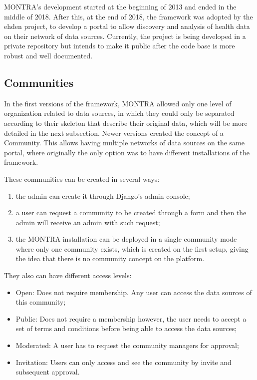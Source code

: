 MONTRA's development started at the beginning of 2013 and ended in the middle of 2018.
After this, at the end of 2018, the framework was adopted by the \gls{ehden} project, to develop a portal to allow discovery and analysis of health data on their network of data sources.
Currently, the project is being developed in a private repository but intends to make it public after the code base is more robust and well documented.

\subsection{Communities}

In the first versions of the framework, MONTRA allowed only one level of organization related to data sources, in which they could only be separated according to their skeleton that describe their original data, which will be more detailed in the next subsection.
Newer versions created the concept of a Community.
This allows having multiple networks of data sources on the same portal, where originally the only option was to have different installations of the framework.

These communities can be created in several ways:

\begin{enumerate}
    \item the admin can create it through Django's admin console;
    \item a user can request a community to be created through a form and then the admin will receive an admin with such request;
    \item the MONTRA installation can be deployed in a single community mode where only one community exists, which is created on the first setup, giving the idea that there is no community concept on the platform.
\end{enumerate}

They also can have different access levels:

\begin{itemize}
    \item Open: Does not require membership. Any user can access the data sources of this community;
    \item Public: Does not require a membership however, the user needs to accept a set of terms and conditions before being able to access the data sources;
    \item Moderated: A user has to request the community managers for approval;
    \item Invitation: Users can only access and see the community by invite and subsequent approval.
\end{itemize}

